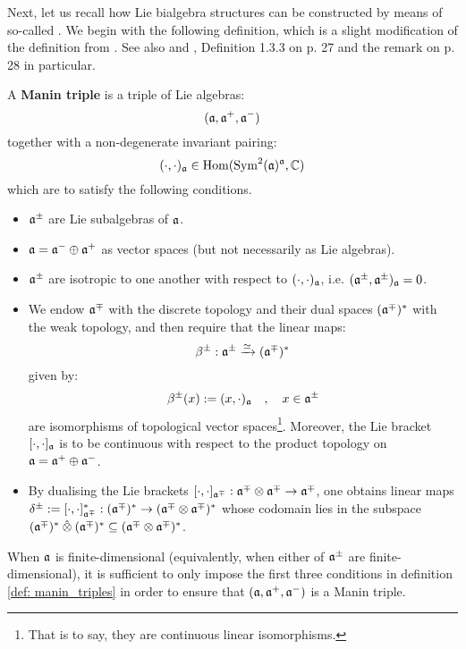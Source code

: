 Next, let us recall how Lie bialgebra structures can be constructed by means of so-called . We begin with the following definition, which is a slight modification of the definition from \cite[Subsection 2.6]{appel_laredo_2_categorical_etingof_kazhdan_quantisation}. See also \cite[Subsection 7.4]{etingof_kazhdan_quantisation_1} and \cite[Subsection 1.3.B]{chari_pressley_quantum_groups}, Definition 1.3.3 on p. 27 and the remark on p. 28 in particular.
\begin{definition} \label{def: manin_triples}
    A \textbf{Manin triple} is a triple of Lie algebras:
        $$(\mathfrak{a}, \mathfrak{a}^+, \mathfrak{a}^-)$$
    together with a non-degenerate invariant pairing:
        $$(\cdot, \cdot)_{\mathfrak{a}} \in \operatorname{Hom}( \operatorname{Sym}^2(\mathfrak{a})^{\mathfrak{a}}, \mathbb{C} )$$
    which are to satisfy the following conditions.
    \begin{itemize}
        \item $\mathfrak{a}^{\pm}$ are Lie subalgebras of $\mathfrak{a}$.
        \item $\mathfrak{a} = \mathfrak{a}^- \oplus \mathfrak{a}^+$ as vector spaces (but not necessarily as Lie algebras).
        \item $\mathfrak{a}^{\pm}$ are isotropic to one another with respect to $(\cdot, \cdot)_{\mathfrak{a}}$, i.e. $(\mathfrak{a}^{\pm}, \mathfrak{a}^{\pm})_{\mathfrak{a}} = 0$.
        \item We endow $\mathfrak{a}^{\mp}$ with the discrete topology and their dual spaces $(\mathfrak{a}^{\mp})^*$ with the weak topology, and then require that the linear maps:
            \begin{equation} \label{equation: manin_triple_currying}
                \beta^{\pm}: \mathfrak{a}^{\pm} \xrightarrow[]{\simeq} (\mathfrak{a}^{\mp})^*
            \end{equation}
        given by:
            $$\beta^{\pm}(x) := (x, \cdot)_{\mathfrak{a}} \quad, \quad x \in \mathfrak{a}^{\pm}$$
        are isomorphisms of topological vector spaces\footnote{That is to say, they are continuous linear isomorphisms.}. Moreover, the Lie bracket $[\cdot, \cdot]_{\mathfrak{a}}$ is to be continuous with respect to the product topology on $\mathfrak{a} = \mathfrak{a}^+ \oplus \mathfrak{a}^-$.
        \item By dualising the Lie brackets $[\cdot, \cdot]_{\a^{\mp}}: \a^{\mp} \tensor \a^{\mp} \to \a^{\mp}$, one obtains linear maps $\delta^{\pm} := [\cdot, \cdot]_{\a^{\mp}}^*: (\a^{\mp})^* \to (\a^{\mp} \tensor \a^{\mp})^*$ whose codomain lies in the subspace $(\a^{\mp})^* \hattensor (\a^{\mp})^* \subseteq (\a^{\mp} \tensor \a^{\mp})^*$.
    \end{itemize}
\end{definition}
\begin{remark}
    When $\mathfrak{a}$ is finite-dimensional (equivalently, when either of $\mathfrak{a}^{\pm}$ are finite-dimensional), it is sufficient to only impose the first three conditions in definition \ref{def: manin_triples} in order to ensure that $(\mathfrak{a}, \mathfrak{a}^+, \mathfrak{a}^-)$ is a Manin triple.
\end{remark}


